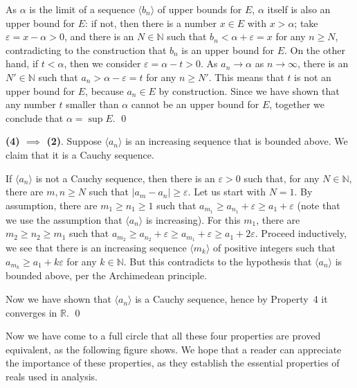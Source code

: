 As $\alpha$ is the limit of a sequence $\langle b_n \rangle$ of upper bounds for $E$, $\alpha$ itself is also an upper bound for $E$: if not, then there is a number $x \in E$ with $x > \alpha$; take $\varepsilon = x - \alpha > 0$, and there is an $N \in \mathbb{N}$ such that $b_n < \alpha + \varepsilon = x$ for any $n \geqslant N$, contradicting to the construction that $b_n$ is an upper bound for $E$.
On the other hand, if $t < \alpha$, then we consider $\varepsilon = \alpha - t > 0$.  As $a_n \to \alpha$ as $n \to \infty$, there is an $N' \in \mathbb{N}$ such that $a_n > \alpha - \varepsilon = t$ for any $n \geqslant N'$. 
This means that $t$ is not an upper bound for $E$, because $a_n \in E$ by construction.
Since we have shown that any number $t$ smaller than $\alpha$ cannot be an upper bound for $E$, together we conclude that $\alpha = \sup E$.  \qed

\medskip
\noindent\textbf{(4) $\implies$ (2)}.
Suppose $\langle a_n \rangle$ is an increasing sequence that is bounded above.
We claim that it is a Cauchy sequence.

If $\langle a_n \rangle$ is not a Cauchy sequence, then there is an $\varepsilon > 0$ such that, for any $N \in \mathbb{N}$, there are $m, n \geqslant N$ such that $|a_m - a_n| \geqslant \varepsilon$.
Let us start with $N = 1$.
By assumption, there are $m_1 \geqslant n_1 \geqslant 1$ such that $a_{m_1} \geqslant a_{n_1} + \varepsilon \geqslant a_1 + \varepsilon$ (note that we use the assumption that $\langle a_n \rangle$ is increasing).
For this $m_1$, there are $m_2 \geqslant n_2 \geqslant m_1$ such that $a_{m_2} \geqslant a_{n_2} + \varepsilon \geqslant a_{m_1} + \varepsilon \geqslant a_1 + 2 \varepsilon$.
Proceed inductively, we see that there is an increasing sequence $\langle m_k \rangle$ of positive integers such that $a_{m_k} \geqslant a_1 + k \varepsilon$ for any $k \in \mathbb{N}$.
But this contradicts to the hypothesis that $\langle a_n \rangle$ is bounded above, per the Archimedean principle.

Now we have shown that $\langle a_n \rangle$ is a Cauchy sequence, hence by Property~4 it converges in $\mathbb{R}$.  \qed

\medskip
Now we have come to a full circle that all these four properties are proved equivalent, as the following figure shows.  We hope that a reader can appreciate the importance of these properties, as they establish the essential properties of reals used in analysis.

